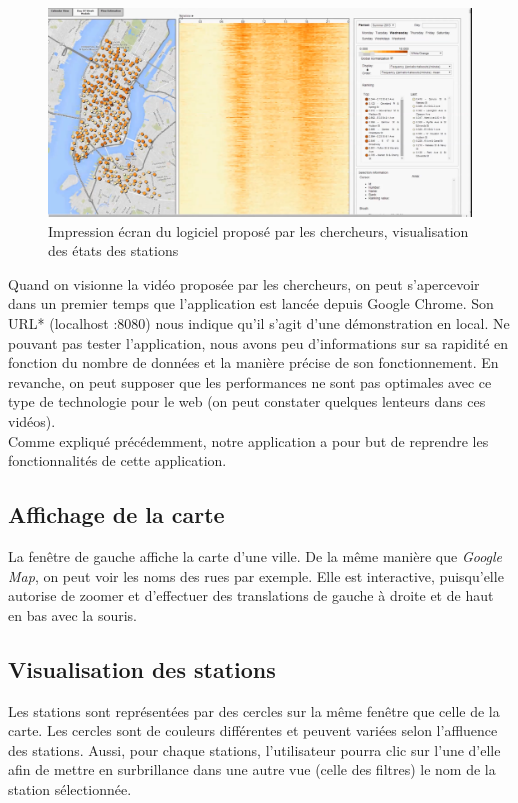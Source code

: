 \documentclass[12pt]{article}
\begin{document}
	\begin{figure}[!h]
	\begin{center}
	\includegraphics[scale=.3]{existant_station_state.png}
	\caption{Impression écran du logiciel proposé par les chercheurs, visualisation des états
	des stations}
	\label{fig:station_screen}
	\end{center}
	\end{figure}
	
	Quand on visionne la vidéo proposée par les chercheurs, on peut s'apercevoir dans un premier
	temps que l’application est lancée depuis Google Chrome. Son URL* (localhost :8080)
	nous indique qu’il s’agit d’une démonstration en local. Ne pouvant pas tester l’application,
	nous avons peu d’informations sur sa rapidité en fonction du nombre de données et la manière
	précise de son fonctionnement. En revanche, on peut supposer que les performances ne
	sont pas optimales avec ce type de technologie pour le web (on peut constater
	quelques lenteurs dans ces vidéos).\\
	Comme expliqué précédemment, notre application a pour but de reprendre les
	fonctionnalités de cette application.
	
		\subsection{Affichage de la carte} \label{interactions_et_affichages}
		La fenêtre de gauche affiche la carte d'une ville. De la même manière que
		\textit{Google Map}, on peut voir les noms des rues par exemple. Elle est interactive,
		puisqu'elle autorise de zoomer et d'effectuer des translations de gauche à droite et 
		de haut en bas avec la souris.
		
		\subsection{Visualisation des stations}
		Les stations sont représentées par des cercles sur la même fenêtre que celle de la carte.
		Les cercles sont de couleurs différentes et peuvent variées selon l'affluence des stations.
		Aussi, pour chaque stations, l'utilisateur pourra clic sur l'une d'elle afin de mettre
		en surbrillance dans une autre vue (celle des filtres) le nom de la station sélectionnée.
		
\end{document}
